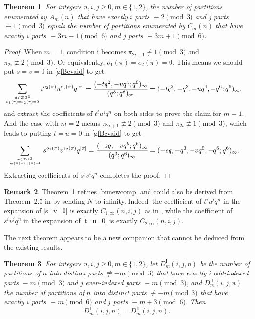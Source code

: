 \documentclass[12pt]{amsart}
\numberwithin{equation}{section}
\theoremstyle{plain}
\newtheorem{theorem}{Theorem}[section]
\theoremstyle{definition}
\newtheorem{remark}[theorem]{Remark}
\begin{document}
\begin{theorem}\label{bunewcomp-refine}
For integers $n,i,j\geq 0, m\in\{1,2\}$, the number of partitions enumerated by $A_m(n)$ that have exactly $i$ parts $\equiv 2 \pmod 3$ and $j$ parts $\equiv 1 \pmod 3$ equals the number of partitions enumerated by $C_m(n)$ that have exactly $i$ parts $\equiv 3m-1 \pmod 6$ and $j$ parts $\equiv 3m+1 \pmod 6$.
\end{theorem}
\begin{proof}
When $m=1$, condition i becomes $\pi_{2i+1}\not\equiv 1 \pmod 3$ and $\pi_{2i}\not\equiv 2 \pmod 3$. Or equivalently, $o_1(\pi)=e_2(\pi)=0$. This means we should put $s=v=0$ in \eqref{gfBevaid} to get
\begin{align}
\label{s=v=0}
\sum\limits_{\pi\in\mathcal{DS}^3 \atop o_1(\pi)=e_2(\pi)=0}t^{o_2(\pi)}u^{e_1(\pi)}q^{|\pi|}&=\dfrac{(-tq^2,-uq^4;q^6)_{\infty}}{(q^3;q^6)_{\infty}}=(-tq^2,-q^3,-uq^4,-q^6;q^6)_{\infty},
\end{align}
and extract the coefficients of $t^iu^jq^n$ on both sides to prove the claim for $m=1$. And the case with $m=2$ means $\pi_{2i+1}\not\equiv 2 \pmod 3$ and $\pi_{2i}\not\equiv 1 \pmod 3$, which leads to putting  $t=u=0$ in \eqref{gfBevaid} to get
\begin{align}
\label{t=u=0}
\sum\limits_{\pi\in\mathcal{DS}^3 \atop o_2(\pi)=e_1(\pi)=0}s^{o_1(\pi)}v^{e_2(\pi)}q^{|\pi|}&=\dfrac{(-sq,-vq^5;q^6)_{\infty}}{(q^3;q^6)_{\infty}}=(-sq,-q^3,-vq^5,-q^6;q^6)_{\infty}.
\end{align}
Extracting coefficients of $s^jv^iq^n$ completes the proof.
\end{proof}
\begin{remark}

Theorem~\ref{bunewcomp-refine} refines \eqref{bunewcomp} and could also be derived from Theorem~2.5 in \cite{bu1} by sending $N$ to infinity. Indeed, the coefficient of
$t^iu^jq^n$ in the expansion of \eqref{s=v=0} is exactly $C_{1,\infty}(n,i,j)$ as in \cite{bu1}, while the coefficient of $s^iv^jq^n$ in the expansion of \eqref{t=u=0} is exactly $C_{2,\infty}(n,i,j)$. 
\end{remark}
The next theorem appears to be a new companion that cannot be deduced from the existing results.
\begin{theorem}\label{thm: FZ-inf}
For integers $n,i,j\geq 0, m\in\{1,2\}$, let $D_m^{\text{I}}(i,j,n)$ be 
the number of partitions of $n$ into distinct parts $\not\equiv -m \pmod 3$ that have exactly $i$ odd-indexed parts $\equiv m \pmod 3$ and $j$ even-indexed parts $\equiv m \pmod 3$, 
and $D_m^{\text{II}}(i,j,n)$  the number of partitions of $n$ into distinct parts $\not\equiv -m \pmod 3$ that have exactly $i$ parts $\equiv m \pmod 6$ and $j$ parts $\equiv m+3 \pmod 6$. Then
$$
D_m^{\text{I}}(i,j,n)=D_m^{\text{II}}(i,j,n).
$$
\end{theorem}
\end{document}
